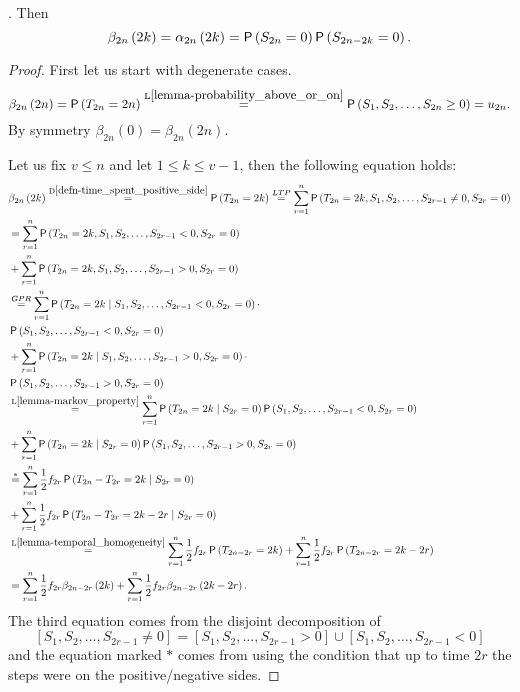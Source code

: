 \begin{thm}\label{thm-arcsine_sojourn_times}
 \Lrws. Then
 \[
 \beta_{2n} \left( 2k \right) =\alpha_{2n} \left( 2k \right)=\operatorname{\mathsf{P}}\left( S_{2n}=0\right)\operatorname{\mathsf{P}}\left( S_{2n-2k}=0\right).
 \]
\end{thm}
\begin{proof}%
 First let us start with degenerate cases.
 \[
    \beta_{2n} \left( 2n \right)
    =\operatorname{\mathsf{P}} \left( T_{2n}=2n \right)
    \overset{\text{L}\ref{lemma-probability_above_or_on}}{=}\operatorname{\mathsf{P}} \left( S_1, S_2, \ldots, S_{2n}\geq 0 \right) =u_{2n}.
 \]
 By symmetry $\beta_{2n} \left( 0 \right) =\beta_{2n} \left( 2n \right).$

 Let us fix $v \leq n$ and let $1 \leq k \leq v-1$, then the following equation holds:
 \[
  \begin{split}
    & \beta_{2n} \left( 2k \right) \overset{\text{D}\ref{defn-time_spent_positive_side}}{=} \pr \left( T_{2n}=2k \right)
     \ltp \suma[r][1][n]\pr \left( T_{2n}=2k, S_1, S_2, \ldots, S_{2r-1}\neq 0, S_{2r}=0 \right)\\
    & = \suma[r][1][n]\pr \left( T_{2n}=2k, S_1, S_2, \ldots, S_{2r-1}< 0, S_{2r}=0 \right)\\
    & +\suma[r][1][n]\pr \left( T_{2n}=2k, S_1, S_2, \ldots, S_{2r-1}> 0, S_{2r}=0 \right)\\
    & \gpr \suma[r][1][n]\pr \left( T_{2n}=2k \Mid S_1, S_2, \ldots, S_{2r-1}< 0, S_{2r}=0 \right) \cdot \\
    & \pr \left( S_1, S_2, \ldots, S_{2r-1}< 0, S_{2r}=0 \right)\\
    & +\suma[r][1][n]\pr \left( T_{2n}=2k \Mid S_1, S_2, \ldots, S_{2r-1}> 0, S_{2r}=0 \right) \cdot \\
    & \pr \left( S_1, S_2, \ldots, S_{2r-1}>0, S_{2r}=0 \right)\\
    & \overset{\text{L}\ref{lemma-markov_property}}{=} \suma[r][1][n]\pr \left( T_{2n}=2k \Mid S_{2r}=0 \right)
    \pr \left( S_1, S_2, \ldots, S_{2r-1}< 0, S_{2r}=0 \right)\\
    & +\suma[r][1][n]\pr \left( T_{2n}=2k \Mid S_{2r}=0 \right)
    \pr \left( S_1, S_2, \ldots, S_{2r-1}>0, S_{2r}=0 \right)\\
    & \overset{*}{=} \suma[r][1][n] \h f_{2r} \pr \left( T_{2n}-T_{2r}=2k \Mid S_{2r}=0 \right)\\
    & + \suma[r][1][n] \h f_{2r} \pr \left( T_{2n}-T_{2r}=2k-2r \Mid S_{2r}=0 \right)\\
    &\overset{\text{L}\ref{lemma-temporal_homogeneity}}{=} \suma[r][1][n] \h f_{2r} \pr \left( T_{2n-2r}=2k\right)
    + \suma[r][1][n] \h f_{2r} \pr \left( T_{2n-2r}=2k-2r\right)\\
    &=\suma[r][1][n] \h f_{2r} \beta_{2n-2r}\left(2k \right) +\suma[r][1][n] \h f_{2r}\beta_{2n-2r}\left(2k-2r\right).
  \end{split}
 \]
 The third equation comes from the disjoint decomposition of
 \[
 [S_1, S_2, \ldots, S_{2r-1}\neq 0]=[S_1, S_2, \ldots, S_{2r-1}> 0]\cup[S_1, S_2, \ldots, S_{2r-1}<0]
 \]
  and the equation marked $*$ comes from using the condition that up to time $2r$ the steps were on the positive/negative sides.


\end{proof}
